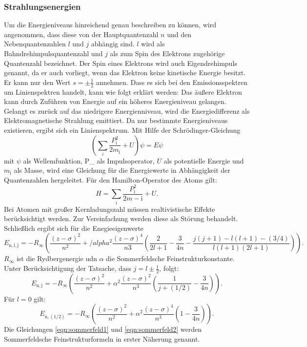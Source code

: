 \subsubsection{Strahlungsenergien}
Um die Energieniveaus hinreichend genau beschreiben zu können, wird angenommen, dass diese von der Hauptquantenzahl $n$ und den Nebenquantenzahlen $l$ und $j$ abhängig sind. $l$ wird als Bahndrehimpulsquantenzahl und $j$ als zum Spin des Elektrons zugehörige Quantenzahl bezeichnet. Der Spin eines Elektrons wird auch Eigendrehimpuls genannt, da er auch vorliegt, wenn das Elektron keine kinetische Energie besitzt. Er kann nur den Wert $s=\pm\frac{1}{2}$ annehmen.
Dass es sich bei den Emissionsspektren um Linienspektren handelt, kann wie folgt erklärt werden:
Das äußere Elektron kann durch Zuführen von Energie auf ein höheres Energieniveau gelangen. Gelangt es zurück auf das niedrigere Energienniveau, wird die Energiedifferenz als Elektromagnetische Strahlung emittiert. Da nur bestimmte Energieniveaus existieren, ergibt sich ein Linienspektrum.
Mit Hilfe der Schrödinger-Gleichung
\begin{equation}
  \left(\sum_{i}\frac{P_\mathrm{i}^2}{2m_\mathrm{i}}+U\right)\psi =  E\psi
\end{equation}
mit $\psi$ als Wellemfunktion, P_ als Impulsoperator, $U$ als potentielle Energie und $m_\mathrm{i}$ als Masse, wird eine Gleichung für die Energiewerte in Abhängigkeit der Quantenzahlen hergeleitet. Für den Hamilton-Operator des Atoms gilt:
\begin{equation}
  H=\sum_{i}\frac{P_\mathrm{i}^2}{2m-\mathrm{i}} + U.
\end{equation}
Bei Atomen mit großer Kernladungszahl müssen realtivistische Effekte berücksichtigt werden. Zur Vereinfachung werden diese als Störung behandelt. Schließlich ergibt sich für die Enegieeigenwerte
\begin{equation}
  E_\mathrm{n,l,j} = -R_\infty \left(\frac{(z-\sigma)^2}{n^2}+/alpha^2\frac{(z-\sigma)^4}{n3}\left(\frac{2}{2l+1}-\frac{3}{4n}-\frac{j(j+1)-l(l+1)-(3/4)}{l(l+1)(2l+1)}\right)\right).
\end{equation}
$R_\infty$ ist die Rydbergenergie udn $\alpha$ die Sommerfeldsche Feinstrukturkonstante. Unter Berücksichtigung der Tatsache, dass $j=l \pm \frac{1}{2}$, folgt:
\begin{equation}
  \label{eqn:sommerfeld1}
  E_\mathrm{n,j}= -R_\infty \left(\frac{(z-\sigma)^2}{n^2}+\alpha^2\frac{(z-\sigma)^2}{n^3}\left(\frac{1}{j+(1/2)} -\frac{3}{4n}\right)\right).
\end{equation}
Für $l=0$ gilt:
\begin{equation}
  \label{eqn:sommerfeld2}
  E_\mathrm{n,(1/2)} = -R_\infty \left(\frac{(z-\sigma)^2}{n^2}+\alpha^2\frac{(z-\sigma)^4}{n^3} \left( 1-\frac{3}{4n}\right)\right).
\end{equation}
Die Gleichungen \ref{eqn:sommerfeld1} und \ref{eqn:sommerfeld2} werden Sommerfeldsche Feinstrukturformeln in erster Näherung genannt.

